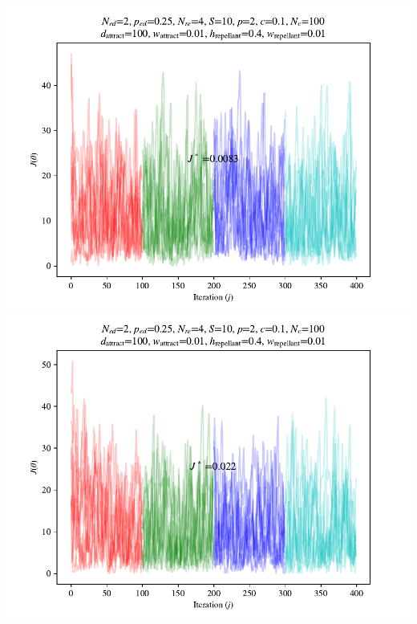\documentclass{beamer}
\begin{document}
\begin{frame}
\begin{columns}
\begin{center}
    \includegraphics[scale=0.3]{assets/rastrigin_colony_ed_2_J}
    \includegraphics[scale=0.3]{assets/rastrigin_colony_ed_3_J}
  \end{center}
\end{columns}
\end{frame}


%
\end{document}
